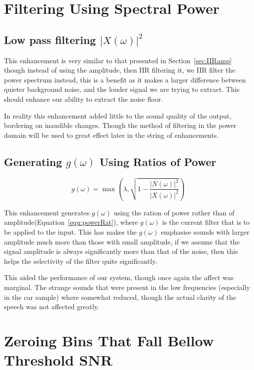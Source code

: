 \documentclass[11pt]{article} %
\begin{document}
\section{Filtering Using Spectral Power} 
\subsection{Low pass filtering $\lvert X(\omega) \rvert^{2} $} 

This enhancement is very similar to that presented in Section~\ref{sec:IIRamp} though instead of using the amplitude, then IIR filtering it, we IIR filter the power spectrum instead, this is a benefit as it makes a larger difference between quieter background noise, and the louder signal we are trying to extract. This should enhance our ability to extract the noise floor. 

In reality this enhancement added little to the sound quality of the output, bordering on inaudible changes. Though the method of filtering in the power domain will be used to great effect later in the string of enhancements.  

\subsection{Generating $g(\omega)$ Using Ratios of Power} 

\begin{equation}
\label{equ:powerRat}
	g(\omega) = \max\left(\lambda, \sqrt{1- \frac{\lvert N(\omega) \rvert ^{2}}{\lvert X(\omega) \rvert ^{2}}}\right)
\end{equation}

This enhancement generates $g(\omega)$ using the ration of power rather than of amplitude(Equation~\ref{equ:powerRat}), where $g(\omega)$ is the current filter that is to be applied to the input. This has makes the $g(\omega)$ emphasise sounds with larger amplitude much more than those with small amplitude, if we assume that the signal amplitude is always significantly more than that of the noise, then this helps the selectivity of the filter quite significantly. 

This aided the performance of our system, though once again the affect was marginal. The strange sounds that were present in the low frequencies (especially in the car sample) where somewhat reduced, though the actual clarity of the speech was not affected greatly.

\section{Zeroing Bins That Fall Bellow Threshold SNR} 
\end{document}
